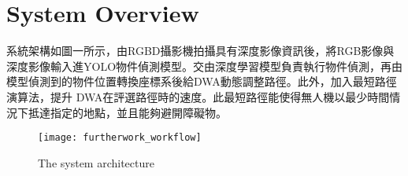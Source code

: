 \documentclass[crop=false]{standalone}
\begin{document}
	\section{System Overview}
	
	系統架構如圖一所示，由RGBD攝影機拍攝具有深度影像資訊後，將RGB影像與深度影像輸入進YOLO物件偵測模型。交由深度學習模型負責執行物件偵測，再由模型偵測到的物件位置轉換座標系後給DWA動態調整路徑。此外，加入最短路徑演算法，提升 DWA在評選路徑時的速度。此最短路徑能使得無人機以最少時間情況下抵達指定的地點，並且能夠避開障礙物。
	
	\begin{figure*}[thbp!]
		\centering
		\texttt{[image: furtherwork\_workflow]}
		\caption{The system architecture}
		\label{fig:system}
	\end{figure*}
\end{document}
